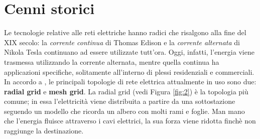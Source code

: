 \section{Cenni storici}
Le tecnologie relative alle reti elettriche hanno radici che risalgono alla fine del XIX secolo: la \textit{corrente continua} di Thomas Edison e la \textit{corrente alternata} di Nikola Tesla continuano ad essere utilizzate tutt'ora. Oggi, infatti, l'energia viene trasmessa utilizzando la corrente alternata, mentre quella continua ha applicazioni specifiche, solitamente all'interno di plessi residenziali e commerciali. \newline \newline
In accordo a \cite{securingSG}, le principali topologie di rete elettrica attualmente in uso sono due: \textbf{radial grid} e \textbf{mesh grid}.
La radial grid (vedi Figura \ref{fig:2}) è la topologia più comune; in essa l'elettricità viene distribuita a partire da una sottostazione seguendo un modello che ricorda un albero con molti rami e foglie.
Man mano che l'energia fluisce attraverso i cavi elettrici, la sua forza viene ridotta finchè non raggiunge la destinazione.
